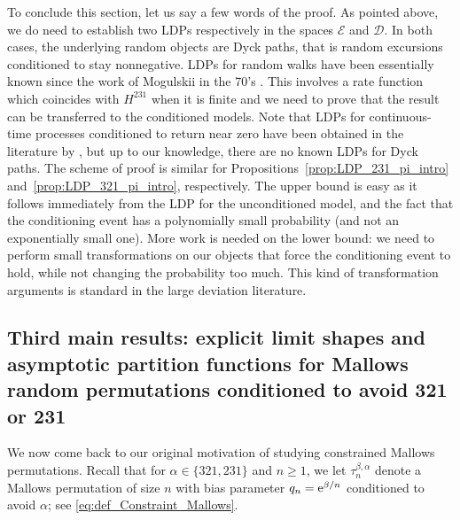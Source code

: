 \documentclass[a4paper,11pt]{amsart}
\newcommand{\ee}{\textup{e}}
\theoremstyle{definition}
\newcommand{\chgts}[1]{{\color{blue} #1}}
\begin{document}
To conclude this section, let us say a few words of the proof. As pointed above, we do need to establish two LDPs respectively in the spaces $\mathcal E$ and $\mathcal D$. In both cases, the underlying random objects are Dyck paths, that is random excursions conditioned to stay nonnegative.
LDPs for random walks have been essentially known since the work of Mogulskii in the 70's \cite{mogulskij1976LDP_Random_Walks}. 
This involves a rate function which coincides with $H^{231}$ when it is finite and
we need to prove that the result can be transferred to the conditioned models.
Note that LDPs for continuous-time processes conditioned to return near zero have been obtained in the literature by \cite{mogulskii2014ldp,dort2024ldp}, but up to our knowledge, there are no known LDPs for Dyck paths.
The scheme of proof is similar for Propositions~\ref{prop:LDP_231_pi_intro} and~\ref{prop:LDP_321_pi_intro}, respectively.
The upper bound is easy as it follows immediately from the LDP for the unconditioned model,
and the fact that the conditioning event has a polynomially small probability (and not an exponentially small one).
More work is needed on the lower bound: we need to perform small transformations on our objects that force the conditioning event to hold, while not changing the probability too much.
This kind of transformation arguments is standard in the large deviation literature.


\subsection{Third main results: explicit limit shapes and asymptotic partition functions for Mallows random permutations conditioned to avoid 321 or 231}
\label{sec: permuton limits}

We now come back to our original motivation of studying constrained Mallows permutations.
Recall that for $\alpha\in\{321,231\}$ and $n\ge1$, we let $\tau_n^{\beta,\alpha}$ denote a Mallows permutation of size $n$ with bias parameter $q_n = \ee^{\beta/n}$ conditioned to avoid $\alpha$; see \eqref{eq:def_Constraint_Mallows}.
\end{document}
